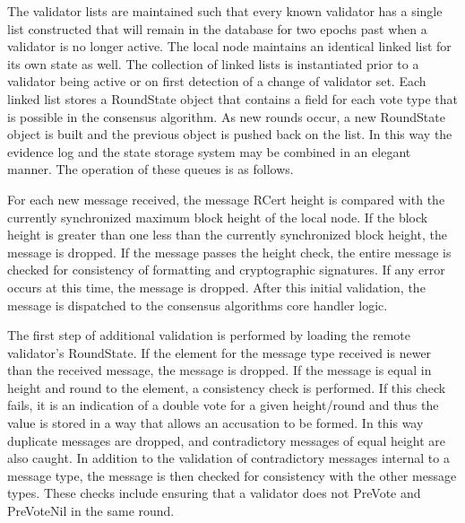 The validator lists are maintained such that every known validator has
a single list constructed that will remain in the database for two
epochs past when a validator is no longer active.
The local node maintains an identical linked list for its own state as
well.
The collection of linked lists is instantiated prior to a validator
being active or on first detection of a change of validator set.
Each linked list stores a RoundState object that contains a field for
each vote type that is possible in the consensus algorithm.
As new rounds occur, a new RoundState object is built and the previous
object is pushed back on the list.
In this way the evidence log and the state storage system may be
combined in an elegant manner.
The operation of these queues is as follows.

For each new message received, the message RCert height is compared
with the currently synchronized maximum block height of the local node.
If the block height is greater than one less than the currently
synchronized block height, the message is dropped.
 If the message passes the height check, the entire message is checked
for consistency of formatting and cryptographic signatures.
If any error occurs at this time, the message is dropped.
After this initial validation, the message is dispatched to the
consensus algorithms core handler logic.

The first step of additional validation is performed by loading the
remote validator's RoundState.
If the element for the message type received is newer than the
received message, the message is dropped.
If the message is equal in height and round to the element, a
consistency check is performed.
If this check fails, it is an indication of a double vote for a given
height/round and thus the value is stored in a way that allows an
accusation to be formed.
In this way duplicate messages are dropped, and contradictory messages
of equal height are also caught.
In addition to the validation of contradictory messages internal to a
message type, the message is then checked for consistency with the
other message types.
These checks include ensuring that a validator does not PreVote and
PreVoteNil in the same round.


